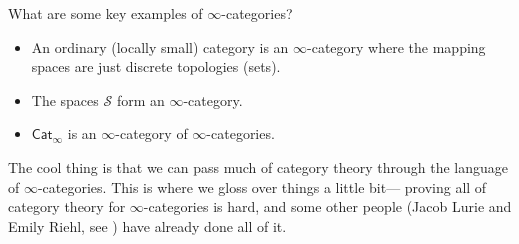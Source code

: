 \begin{example}
    What are some key examples of $\infty$-categories?
    \begin{itemize}
\setlength\itemsep{-.2em}
        \item An ordinary (locally small) category is an $\infty$-category where the mapping spaces are just discrete topologies (sets).
        \item The spaces $\mathcal{S} $ form an $\infty$-category.
        \item $\mathsf{Cat} _{\infty}$ is an $\infty$-category of $\infty$-categories.
    \end{itemize}
\end{example}
The cool thing is that we can pass much of category theory through the language of $\infty$-categories. This is where we gloss over things a little bit--- proving all of category theory for $\infty$-categories is hard, and some other people (Jacob Lurie and Emily Riehl, see \cite{ref:lurie} ) have already done all of it.
